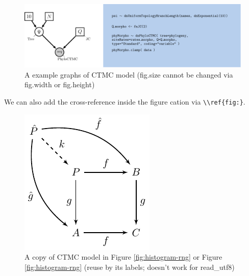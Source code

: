 \documentclass[
]{article}
\begin{document}
\begin{figure}

{\centering \includegraphics{figures/CTMCgraphs-1} 

}

\caption{A example graphs of CTMC model (fig.size cannot be changed via fig.width or fig.height)}\label{fig:CTMCgraphs}
\end{figure}

We can also add the cross-reference inside the figure cation via \texttt{\textbackslash{}\textbackslash{}ref\{fig:\}}.

\begin{figure}
\centering
\includegraphics{figures/simpletikz-1.pdf}
\caption{\label{fig:simpletikz}A copy of CTMC model in Figure \ref{fig:histogram-rng} or Figure \ref{fig:histogram-rng} (reuse by its labels; doesn't work for read\_utf8)}
\end{figure}

\clearpage

\printbibliography[title=References]
\end{document}
